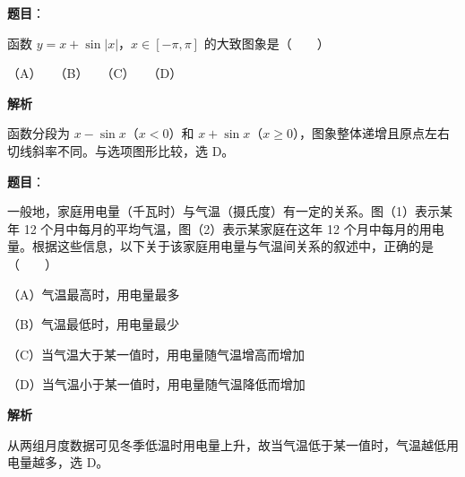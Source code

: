 \begin{answer}

\textbf{题目}：

函数 $y=x+\sin|x|$，$x\in[-\pi,\pi]$ 的大致图象是\mbox{（　　）}
\nopagebreak[4]
\begin{center}\end{center}
\nopagebreak[4]
（A）　　（B）　　（C）　　（D）

\textbf{解析}

函数分段为 $x-\sin x$（$x<0$）和 $x+\sin x$（$x\ge0$），图象整体递增且原点左右切线斜率不同。与选项图形比较，选 D。


\end{answer}
\begin{answer}

\textbf{题目}：

一般地，家庭用电量（千瓦时）与气温（摄氏度）有一定的关系。图（1）表示某年 12 个月中每月的平均气温，图（2）表示某家庭在这年 12 个月中每月的用电量。根据这些信息，以下关于该家庭用电量与气温间关系的叙述中，正确的是\mbox{（　　）}
\nopagebreak[4]
\begin{center}\end{center}
\nopagebreak[4]
（A）气温最高时，用电量最多

（B）气温最低时，用电量最少

（C）当气温大于某一值时，用电量随气温增高而增加

（D）当气温小于某一值时，用电量随气温降低而增加

\textbf{解析}

从两组月度数据可见冬季低温时用电量上升，故当气温低于某一值时，气温越低用电量越多，选 D。


\end{answer}

